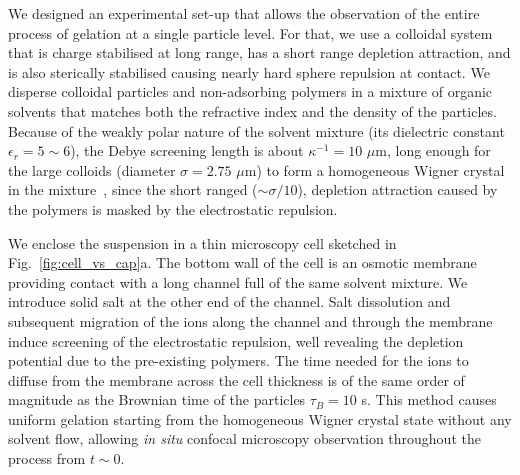 \documentclass[preprint,footinbib,amsmath,amssymb]{revtex4}
\begin{document}




We designed an experimental set-up that allows the observation of the entire process of gelation at a single particle level. For that, we use a colloidal system that is charge stabilised at long range, has a short range depletion attraction, and is also sterically stabilised causing nearly hard sphere repulsion at contact. We disperse colloidal particles and non-adsorbing polymers in a  mixture of organic solvents that matches both the refractive index and the density of the particles. Because of the weakly polar nature of the solvent mixture (its dielectric constant $\epsilon_r = 5\sim6$), the Debye screening length is about $\kappa^{-1}=10$ $\mu$m, long enough for the large colloids (diameter $\sigma=2.75$ $\mu$m) to form a homogeneous Wigner crystal in the mixture~\cite{klix2010structural}, since the short ranged ($\sim \sigma/10$), depletion attraction caused by the polymers is masked by the electrostatic repulsion.

We enclose the suspension in a thin microscopy cell sketched in Fig.~\ref{fig:cell_vs_cap}a. The bottom wall of the cell is an osmotic membrane providing contact with a long channel full of the same solvent mixture. We introduce solid salt at the other end of the channel. Salt dissolution and subsequent migration of the ions along the channel and through the membrane induce screening of the electrostatic repulsion, well revealing the depletion potential due to the pre-existing polymers. The time needed for the ions to diffuse from the membrane across the cell thickness is of the same order of magnitude as the Brownian time of the particles $\tau_B=10$ s. This method causes uniform gelation starting from the homogeneous Wigner crystal state without any solvent flow, allowing \textit{in situ} confocal microscopy observation throughout the process from $t \sim 0$.
\end{document}
